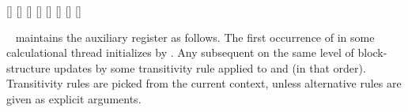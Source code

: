 \begin{isabellebody}
\begin{isamarkuptext}
  \begin{railoutput}
\rail@bar
{}[]
[]
\rail@endbar
\rail@bar
{}
[]
[]
[]
\rail@endbar
\rail@end
{}
[]
\rail@bar
{}
[]
[]
\rail@endbar
\rail@end
\end{railoutput}


  \begin{description}

  \item \hyperlink{command.also}{\mbox{}}~ maintains the auxiliary
  \hyperlink{fact.calculation}{\mbox{}} register as follows.  The first occurrence of
  \hyperlink{command.also}{\mbox{}} in some calculational thread initializes \hyperlink{fact.calculation}{\mbox{}} by \hyperlink{fact.this}{\mbox{}}. Any subsequent \hyperlink{command.also}{\mbox{}} on
  the same level of block-structure updates \hyperlink{fact.calculation}{\mbox{}} by
  some transitivity rule applied to \hyperlink{fact.calculation}{\mbox{}} and \hyperlink{fact.this}{\mbox{}} (in that order).  Transitivity rules are picked from the
  current context, unless alternative rules are given as explicit
  arguments.


\end{description}
\end{isamarkuptext}
\end{isabellebody}
